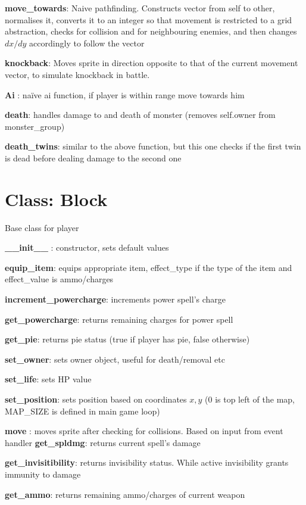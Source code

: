 \documentclass{article}
\begin{document}
\textbf{move\_towards}: Naive pathfinding. Constructs vector from self to other, normalises it, converts it to an integer so that movement is restricted to a grid abstraction, checks for collision and for neighbouring enemies, and then changes $dx/dy$ accordingly to follow the vector

\textbf{knockback}: Moves sprite in direction opposite to that of the current movement vector, to simulate knockback in battle.

\textbf{Ai }: naïve ai function, if player is within range move towards him

\textbf{death}: handles damage to and death of  monster (removes self.owner from monster\_group)

\textbf{death\_twins}: similar to the above function, but this one checks if the first twin is dead 
before dealing damage to the second one



\section{Class: Block}

Base class for player

\textbf{\_\_init\_\_ }: constructor, sets default values


\textbf{equip\_item}: equips appropriate item, effect\_type if the type of the item and  effect\_value is ammo/charges

\textbf{increment\_powercharge}: increments power spell's charge

\textbf{get\_powercharge}: returns remaining charges for power spell

\textbf{get\_pie}: returns pie status (true if player has pie, false otherwise)

\textbf{set\_owner}: sets owner object, useful for death/removal etc

\textbf{set\_life}: sets HP value

\textbf{set\_position}: sets position based on coordinates $x,y$ (0 is top left of the map, MAP\_SIZE is defined in main game loop)

\textbf{move }: moves sprite after checking for collisions. Based on input from event handler
\textbf{get\_spldmg}: returns current spell's damage 

\textbf{get\_invisitibility}: returns invisibility status. While active invisibility grants immunity to damage

\textbf{get\_ammo}: returns remaining ammo/charges of current weapon
\end{document}
